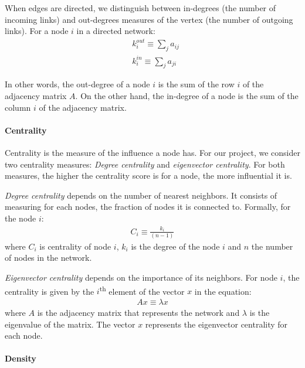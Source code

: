         When edges are directed, we distinguish between in-degrees (the number of incoming links) and out-degrees measures of the vertex (the number of outgoing links). For a node $i$ in a directed network: %
        \begin{align}
            &k_i^{out} \equiv \sum_{j} a_{ij}
            \\
            &k_i^{in} \equiv \sum_{j} a_{ji}
        \end{align}
        
        In other words, the out-degree of a node $i$ is the sum of the row $i$ of the adjacency matrix $A$. On the other hand, the in-degree of a node is the sum of the column $i$ of the adjacency matrix.


        \paragraph{Centrality} 
        Centrality is the measure of the influence a node has. For our project, we consider two centrality measures: {\it Degree centrality} and {\it eigenvector centrality}. For both measures, the higher the centrality score is for a node, the more influential it is.
        
        \vspace{1em}
        {\it Degree centrality} depends on the number of nearest neighbors. It consists of measuring for each nodes, the fraction of nodes it is connected to. Formally, for the node $i$: 
        \begin{align}
            C_i \equiv \frac{k_i}{(n-1)}
        \end{align}
        where $C_i$ is centrality of node $i$, $k_i$ is the degree of the node $i$ and $n$ the number of nodes in the network.
        
        \vspace{1em}
        {\it Eigenvector centrality} depends on the importance of its neighbors. For node $i$, the centrality is given by the $i$\textsuperscript{th} element of the vector $x$ in the equation: 
        \begin{align}
            Ax \equiv \lambda x
        \end{align}
        where $A$ is the adjacency matrix that represents the network and $\lambda$ is the eigenvalue of the matrix. The vector $x$ represents the eigenvector centrality for each node.
        
        
        \paragraph{Density} 
        
